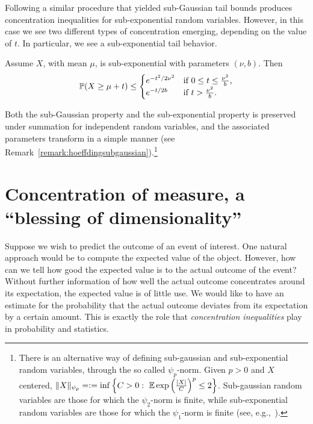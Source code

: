 Following  a similar procedure that yielded sub-Gaussian tail bounds produces concentration inequalities for sub-exponential random variables. However, in this case we see two different types of concentration emerging, depending on the value of $t$. In particular, we see a sub-exponential tail behavior.
\begin{proposition} \label{prop:subexponential}
Assume $X$, with mean $\mu$, is sub-exponential with parameters $(\nu,b)$. Then
\begin{equation}\label{subexponentialtail}
 \P (X \ge \mu + t) \le \begin{cases}
 e^{-t^2/2\nu^2} & \text{if $0 \le t \le \frac{\nu^2}{b}$,} \\
 e^{-t/2b} & \text{if $t > \frac{\nu^2}{b}$.}
\end{cases}
\end{equation}
\end{proposition}

Both the sub-Gaussian property and  the sub-exponential property is preserved under
summation for independent random variables, and the associated parameters transform in
a simple manner (see Remark~\ref{remark:hoeffdingsubgaussian}).\footnote{There is an alternative way of defining sub-gaussian and sub-exponential random variables, through the so called $\psi_p$-norm. Given $p>0$ and $X$ centered, $\|X\|_{\psi_p} = \defeq \inf\left\{C>0:\ \EE\exp\left(\frac{|X|}{C}\right)^p\leq 2\right\}$. Sub-gaussian random variables are those for which the $\psi_2$-norm is finite, while sub-exponential random variables are those for which the $\psi_1$-norm is finite (see, e.g.,~\cite{vershynin2018}).}


\section{Concentration of measure, a ``blessing of dimensionality''}

Suppose we wish to predict the outcome of an event of interest. One natural approach would be to compute
the expected value of the object. However, how can we tell how good the expected value
is to the actual outcome of the event? Without further information of how well the actual
outcome concentrates around its expectation, the expected value is of little use. We would like
to have an estimate for the probability that the actual outcome deviates from its expectation
by a certain amount. This is exactly the role that  {\em concentration inequalities} play in probability and statistics.

